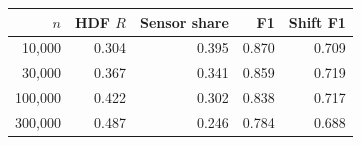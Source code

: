 \begin{tabular}{@{}rrrrr@{}}
\toprule
$n$ & HDF $R$ & Sensor share & F1 & Shift F1 \\
\midrule
10,000 & 0.304 & 0.395 & 0.870 & 0.709 \\
30,000 & 0.367 & 0.341 & 0.859 & 0.719 \\
100,000 & 0.422 & 0.302 & 0.838 & 0.717 \\
300,000 & 0.487 & 0.246 & 0.784 & 0.688 \\
\bottomrule
\end{tabular}
